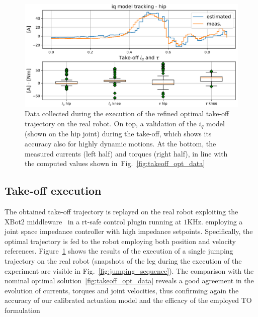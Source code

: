 \begin{figure}[t]
    \centering
    \includegraphics[width=1\columnwidth]{images/hardware_saturation.pdf}
    \caption{Data collected during the execution of the refined optimal take-off trajectory on the real robot. On top, a validation of the $i_q$ model (shown on the hip joint) during the take-off, which shows its accuracy also for highly dynamic motions. At the bottom, the measured currents (left half) and torques (right half), in line with the computed values shown in~Fig.~\ref{fig:takeoff_opt_data}}
    \label{fig:takeoff_execution}
\end{figure}

\subsection{Take-off execution}
The obtained take-off trajectory is replayed on the real robot exploiting the XBot2 middleware~\cite{xbot::LAURENZI2023104379} in a rt-safe control plugin running at $1\mathrm{KHz}$. employing a joint space impedance controller with high impedance setpoints. Specifically, the optimal trajectory is fed to the robot employing both position and velocity references. Figure~\ref{fig:takeoff_execution} shows the results of the execution of a single jumping trajectory on the real robot (snapshots of the leg during the execution of the experiment are visible in Fig.~\ref{fig:jumping_sequence}). The comparison with the nominal optimal solution~\ref{fig:takeoff_opt_data} reveals a good agreement in the evolution of currents, torques and joint velocities, thus confirming again the accuracy of our calibrated actuation model and the efficacy of the employed TO formulation
